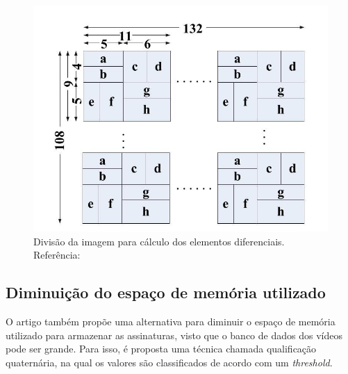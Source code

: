 \begin{figure}[h]
  \centering
    \label{fig:divsceneframe}
  \includegraphics[width=\textwidth]{dados/figuras/sf_division.png}
    \caption{Divisão da imagem para cálculo dos elementos diferenciais. Referência: \citeauthor{mao2015sceneframe}}
\end{figure}

\subsection{Diminuição do espaço de memória utilizado}

O artigo também propõe uma alternativa para diminuir o espaço de memória utilizado para armazenar as assinaturas, visto que o banco de dados dos vídeos pode ser grande. Para isso, é proposta uma técnica chamada qualificação quaternária, na qual os valores são classificados de acordo com um \textit{threshold}.


%
%
